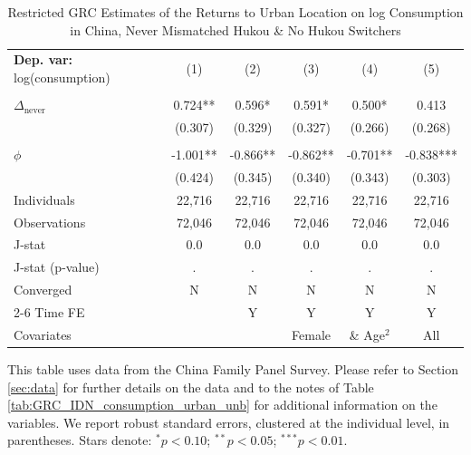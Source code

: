\begin{table}[htbp] \centering \begin{threeparttable}
 \caption{Restricted GRC Estimates of the Returns to Urban Location on log Consumption in China, Never Mismatched Hukou & No Hukou Switchers} 
 \label{tab:GRC_CHN_nm_same_consumption_urban_unb} 
\begin{tabular}{l ccccc} \toprule  \textbf{Dep. var:}  log(consumption) 
                    &\multicolumn{1}{c}{(1)}   &\multicolumn{1}{c}{(2)}   &\multicolumn{1}{c}{(3)}   &\multicolumn{1}{c}{(4)}   &\multicolumn{1}{c}{(5)}   \\
                    &               &               &               &               &               \\
\addlinespace
$\Delta_{\text{never}}$&       0.724** &       0.596*  &       0.591*  &       0.500*  &       0.413   \\
                    &     (0.307)   &     (0.329)   &     (0.327)   &     (0.266)   &     (0.268)   \\
                    &               &               &               &               &               \\
\addlinespace
$\phi$              &      -1.001** &      -0.866** &      -0.862** &      -0.701** &      -0.838***\\
                    &     (0.424)   &     (0.345)   &     (0.340)   &     (0.343)   &     (0.303)   \\
\addlinespace
Individuals         &      22,716   &      22,716   &      22,716   &      22,716   &      22,716   \\
Observations        &      72,046   &      72,046   &      72,046   &      72,046   &      72,046   \\
J-stat              &         0.0   &         0.0   &         0.0   &         0.0   &         0.0   \\
J-stat (p-value)    &           .   &           .   &           .   &           .   &           .   \\
Converged           &           N   &           N   &           N   &           N   &           N   \\
\cmidrule{2-6} Time FE & & Y & Y & Y & Y \\ Covariates & & & Female & \& Age$^2$ & All \\ \bottomrule \end{tabular} \begin{tablenotes}[flushleft] \footnotesize \item{This table uses data from the China Family Panel Survey. Please refer to Section \ref{sec:data} for further details on the data and to the notes of Table \ref{tab:GRC_IDN_consumption_urban_unb} for additional information on the variables. We report robust standard errors, clustered at the individual level, in parentheses. Stars denote: $^{*} p<0.10$; $^{**} p<0.05$; $^{***} p<0.01$.} \end{tablenotes} \end{threeparttable} \end{table}
